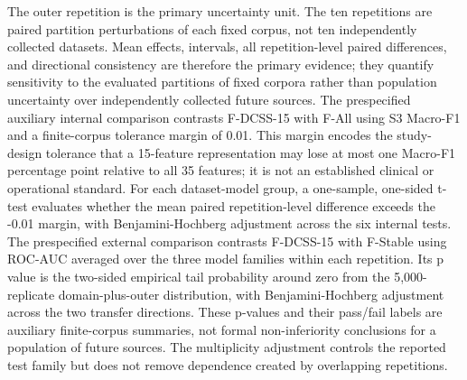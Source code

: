 \documentclass[
  10pt,
]{article}
\begin{document}
The outer repetition is the primary uncertainty unit. The ten
repetitions are paired partition perturbations of each fixed corpus, not
ten independently collected datasets. Mean effects, intervals, all
repetition-level paired differences, and directional consistency are
therefore the primary evidence; they quantify sensitivity to the
evaluated partitions of fixed corpora rather than population uncertainty
over independently collected future sources. The prespecified auxiliary
internal comparison contrasts F-DCSS-15 with F-All using S3 Macro-F1 and
a finite-corpus tolerance margin of 0.01. This margin encodes the
study-design tolerance that a 15-feature representation may lose at most
one Macro-F1 percentage point relative to all 35 features; it is not an
established clinical or operational standard. For each dataset-model
group, a one-sample, one-sided t-test evaluates whether the mean paired
repetition-level difference exceeds the -0.01 margin, with
Benjamini-Hochberg adjustment across the six internal tests. The
prespecified external comparison contrasts F-DCSS-15 with F-Stable using
ROC-AUC averaged over the three model families within each repetition.
Its p value is the two-sided empirical tail probability around zero from
the 5,000-replicate domain-plus-outer distribution, with
Benjamini-Hochberg adjustment across the two transfer directions. These
p-values and their pass/fail labels are auxiliary finite-corpus
summaries, not formal non-inferiority conclusions for a population of
future sources. The multiplicity adjustment controls the reported test
family but does not remove dependence created by overlapping
repetitions.
\end{document}
